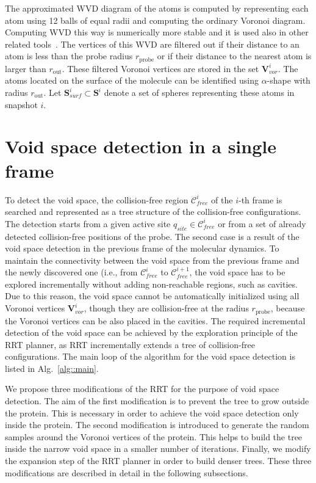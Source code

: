 \documentclass[usletter, 10pt, conference]{svjour3}      %
\def\qinit{q_{site}}
\def\CF{\mathcal{C}_{free}}
\def\VV{\mathbf{V}_{vor}}
\def\probe{r_{\mathrm{probe}}}
\def\gprobe{r_{\mathrm{out}}}
\def\SS{\mathbf{S}}
\def\SSA{\mathbf{S}_{surf}}
\begin{document}
The approximated WVD diagram of the atoms is computed by representing each atom using 12 balls of equal radii and computing the 
ordinary Voronoi diagram.
Computing WVD this way is numerically more stable and it is used also in other related tools~\cite{caver3,yaffe2008}.
The vertices of this WVD are filtered out if their distance to an atom is less than the probe radius $\probe$ or if their
distance to the nearest atom is larger than $\gprobe$.
These filtered Voronoi vertices are stored in the set $\VV^i$.
The atoms located on the surface of the molecule can be identified using \mbox{$\alpha$-shape} with radius $\gprobe$.
Let $\SSA^i \subset \SS^i$ denote a set of spheres representing these atoms in snapshot $i$.


\section{Void space detection in a single frame} 

To detect the void space, the collision-free region $\CF^i$ of the $i$-th frame is searched and represented as a tree structure of the collision-free configurations.
The detection starts from a given active site $\qinit \in \CF^i$ or from a set of already detected collision-free positions of the probe.
The second case is a result of the void space detection in the previous frame of the molecular dynamics.
To maintain the connectivity between the void space from the previous frame and the newly discovered one 
(i.e., from $\CF^i$ to $\CF^{i+1}$, the void space has to be explored incrementally without adding non-reachable regions, such as cavities.
Due to this reason, the void space cannot be automatically initialized using all Voronoi vertices $\VV^i$, though they are collision-free
at the radius $\probe$, because the Voronoi vertices can be also placed in the cavities.
The required incremental detection of the void space can be achieved by the exploration principle of the RRT planner, as RRT incrementally extends a tree of collision-free configurations.
The main loop of the algorithm for the void space detection is listed in Alg.~\ref{alg::main}. 

We propose three modifications of the RRT for the purpose of void space detection.
The aim of the first modification is to prevent the tree to grow outside the protein. 
This is necessary in order to achieve the void space detection only inside the protein.
The second modification is introduced to generate the random samples around the Voronoi vertices of the protein.
This helps to build the tree inside the narrow void space in a smaller number of iterations.
Finally, we modify the expansion step of the RRT planner in order to build denser trees.
These three modifications are described in detail in the following subsections.
\end{document}
